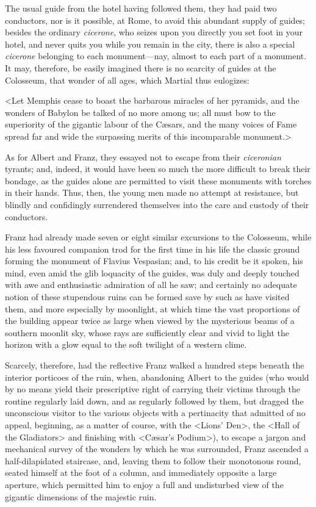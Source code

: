  The usual guide from the hotel having followed them, they had paid two conductors, nor is it possible, at Rome, to avoid this abundant supply of guides; besides the ordinary \textit{cicerone}, who seizes upon you directly you set foot in your hotel, and never quits you while you remain in the city, there is also a special \textit{cicerone} belonging to each monument—nay, almost to each part of a monument. It may, therefore, be easily imagined there is no scarcity of guides at the Colosseum, that wonder of all ages, which Martial thus eulogizes: 

 <Let Memphis cease to boast the barbarous miracles of her pyramids, and the wonders of Babylon be talked of no more among us; all must bow to the superiority of the gigantic labour of the Cæsars, and the many voices of Fame spread far and wide the surpassing merits of this incomparable monument.> 

 As for Albert and Franz, they essayed not to escape from their \textit{ciceronian} tyrants; and, indeed, it would have been so much the more difficult to break their bondage, as the guides alone are permitted to visit these monuments with torches in their hands. Thus, then, the young men made no attempt at resistance, but blindly and confidingly surrendered themselves into the care and custody of their conductors. 

 Franz had already made seven or eight similar excursions to the Colosseum, while his less favoured companion trod for the first time in his life the classic ground forming the monument of Flavius Vespasian; and, to his credit be it spoken, his mind, even amid the glib loquacity of the guides, was duly and deeply touched with awe and enthusiastic admiration of all he saw; and certainly no adequate notion of these stupendous ruins can be formed save by such as have visited them, and more especially by moonlight, at which time the vast proportions of the building appear twice as large when viewed by the mysterious beams of a southern moonlit sky, whose rays are sufficiently clear and vivid to light the horizon with a glow equal to the soft twilight of a western clime. 

 Scarcely, therefore, had the reflective Franz walked a hundred steps beneath the interior porticoes of the ruin, when, abandoning Albert to the guides (who would by no means yield their prescriptive right of carrying their victims through the routine regularly laid down, and as regularly followed by them, but dragged the unconscious visitor to the various objects with a pertinacity that admitted of no appeal, beginning, as a matter of course, with the <Lions' Den>, the <Hall of the Gladiators> and finishing with <Cæsar's Podium>), to escape a jargon and mechanical survey of the wonders by which he was surrounded, Franz ascended a half-dilapidated staircase, and, leaving them to follow their monotonous round, seated himself at the foot of a column, and immediately opposite a large aperture, which permitted him to enjoy a full and undisturbed view of the gigantic dimensions of the majestic ruin. 

